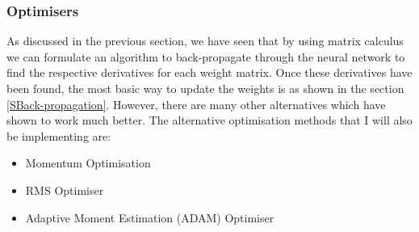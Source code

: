 \subsubsection{Optimisers} \label{Optimisers}
As discussed in the previous section, we have seen that by using matrix calculus we can formulate an algorithm to back-propagate through the neural network to find the respective derivatives for each weight matrix. Once these derivatives have been found, the most basic way to update the weights is as shown in the section \ref{SBack-propagation}. However, there are many other alternatives which have shown to work much better. The alternative optimisation methods that I will also be implementing are:
\begin{itemize}
    \item Momentum Optimisation
    \item RMS Optimiser
    \item Adaptive Moment Estimation (ADAM) Optimiser
\end{itemize}



